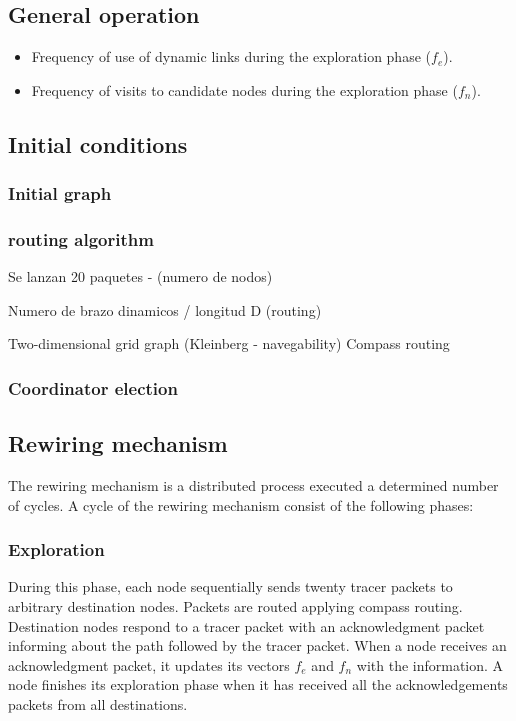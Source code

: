 \subsection{General operation}

\begin{itemize}
    \item Frequency of use of dynamic links during the exploration phase ($f_e$).
    \item Frequency of visits to candidate nodes during the exploration phase ($f_n$).
\end{itemize}

\subsection{Initial conditions}

\subsubsection{Initial graph} 

\subsubsection{routing algorithm}

Se lanzan 20 paquetes - (numero de nodos)

Numero de brazo dinamicos / longitud D (routing)

Two-dimensional grid graph (Kleinberg - navegability)
Compass routing

\subsubsection{Coordinator election}



\subsection{Rewiring mechanism}

The rewiring mechanism is a distributed process executed a determined number of cycles. A cycle of the rewiring mechanism consist of the following phases:

\subsubsection{Exploration}

During this phase, each node sequentially sends twenty tracer packets to arbitrary destination nodes. Packets are routed applying compass routing. Destination nodes respond to a tracer packet with an acknowledgment packet informing about the path followed by the tracer packet.
When a node receives an acknowledgment packet, it updates its vectors $f_e$ and $f_n$ with the information. A node finishes its exploration phase when it has received all the acknowledgements packets from all destinations.

